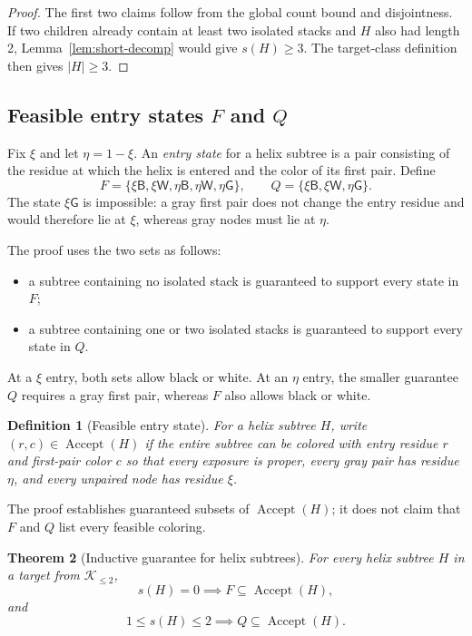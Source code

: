 \documentclass[11pt]{article}
\newtheorem{theorem}{Theorem}[section]
\newtheorem{definition}[theorem]{Definition}
\newcommand{\Bcol}{\mathsf{B}}
\newcommand{\Wcol}{\mathsf{W}}
\newcommand{\Gray}{\mathsf{G}}
\newcommand{\Ktwo}{\mathcal{K}_{\le 2}}
\newcommand{\shortcount}{s}
\newcommand{\Accept}{\operatorname{Accept}}
\begin{document}
\begin{proof}
The first two claims follow from the global count bound and disjointness.  If two children already contain at least two isolated stacks and $H$ also had length 2, Lemma~\ref{lem:short-decomp} would give $\shortcount(H)\ge3$.  The target-class definition then gives $|H|\ge3$.
\end{proof}

\subsection[Feasible entry states F and Q]{Feasible entry states $F$ and $Q$}

Fix $\xi$ and let $\eta=1-\xi$.  An \emph{entry state} for a helix subtree is a pair consisting of the residue at which the helix is entered and the color of its first pair.  Define
\[
F=\{\xi\Bcol,\xi\Wcol,\eta\Bcol,\eta\Wcol,\eta\Gray\},
\qquad
Q=\{\xi\Bcol,\xi\Wcol,\eta\Gray\}.
\]
The state $\xi\Gray$ is impossible: a gray first pair does not change the entry residue and would therefore lie at $\xi$, whereas gray nodes must lie at $\eta$.

The proof uses the two sets as follows:
\begin{itemize}
\item a subtree containing no isolated stack is guaranteed to support every state in $F$;
\item a subtree containing one or two isolated stacks is guaranteed to support every state in $Q$.
\end{itemize}
At a $\xi$ entry, both sets allow black or white.  At an $\eta$ entry, the smaller guarantee $Q$ requires a gray first pair, whereas $F$ also allows black or white.

\begin{definition}[Feasible entry state]
For a helix subtree $H$, write $(r,c)\in\Accept(H)$ if the entire subtree can be colored with entry residue $r$ and first-pair color $c$ so that every exposure is proper, every gray pair has residue $\eta$, and every unpaired node has residue $\xi$.
\end{definition}

The proof establishes guaranteed subsets of $\Accept(H)$; it does not claim that $F$ and $Q$ list every feasible coloring.

\begin{theorem}[Inductive guarantee for helix subtrees]
\label{thm:resource-invariant}
For every helix subtree $H$ in a target from $\Ktwo$,
\[
\shortcount(H)=0 \implies F\subseteq\Accept(H),
\]
and
\[
1\le\shortcount(H)\le2 \implies Q\subseteq\Accept(H).
\]
\end{theorem}
\end{document}
